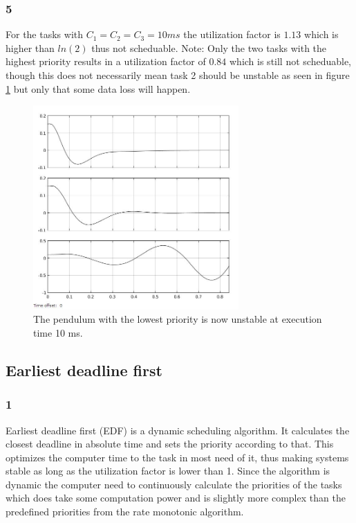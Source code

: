 \documentclass[10pt,a4paper]{article}
\begin{document}
\subsubsection*{5}
For the tasks with $C_1=C_2=C_3=10 ms$ the utilization factor is $1.13$ which is higher than $ln(2)$ thus not scheduable. Note: Only the two tasks with the highest priority results in a utilization factor of $0.84$ which is still not scheduable, though this does not necessarily mean task 2 should be unstable as seen in figure \ref{1} but only that some data loss will happen.
\begin{figure}[!h]\label{1}
  \centering
    \includegraphics[width=0.7\textwidth]{10ms.jpg}
      \caption{The pendulum with the lowest priority is now unstable at execution time 10 ms.}
\end{figure}
\newpage
\subsection*{Earliest deadline first}
\subsubsection*{1}
Earliest deadline first (EDF) is a dynamic scheduling algorithm. It calculates the closest deadline in absolute time and sets the priority according to that. This optimizes the computer time to the task in most need of it, thus making systems stable as long as the utilization factor is lower than 1. Since the algorithm is dynamic the computer need to continuously calculate the priorities of the tasks which does take some computation power and is slightly more complex than the predefined priorities from the rate monotonic algorithm.
\end{document}
